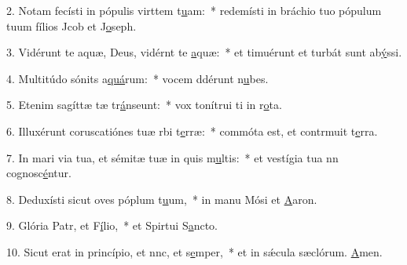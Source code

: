 2. Notam fecísti in pópulis virttem t\uline{u}am:~* redemísti in bráchio tuo pópulum tuum fílios Jcob et J\uline{o}seph.\par 
3. Vidérunt te aquæ, Deus, vidérnt te \uline{a}quæ:~* et timuérunt et turbát sunt ab\uline{ý}ssi.\par 
4. Multitúdo sónits a\uline{quá}rum:~* vocem ddérunt n\uline{u}bes.\par 
5. Etenim sagíttæ tæ tr\uline{á}nseunt:~* vox tonítrui ti in r\uline{o}ta.\par 
6. Illuxérunt coruscatiónes tuæ rbi t\uline{e}rræ:~* commóta est, et contrmuit t\uline{e}rra.\par 
7. In mari via tua, et sémitæ tuæ in quis m\uline{u}ltis:~* et vestígia tua nn cognosc\uline{é}ntur.\par 
8. Deduxísti sicut oves póplum t\uline{u}um,~* in manu Mósi et \uline{A}aron.\par 
9. Glória Patr, et F\uline{í}lio,~* et Spirtui S\uline{a}ncto.\par 
10. Sicut erat in princípio, et nnc, et s\uline{e}mper,~* et in sǽcula sæclórum. \uline{A}men.\par 
